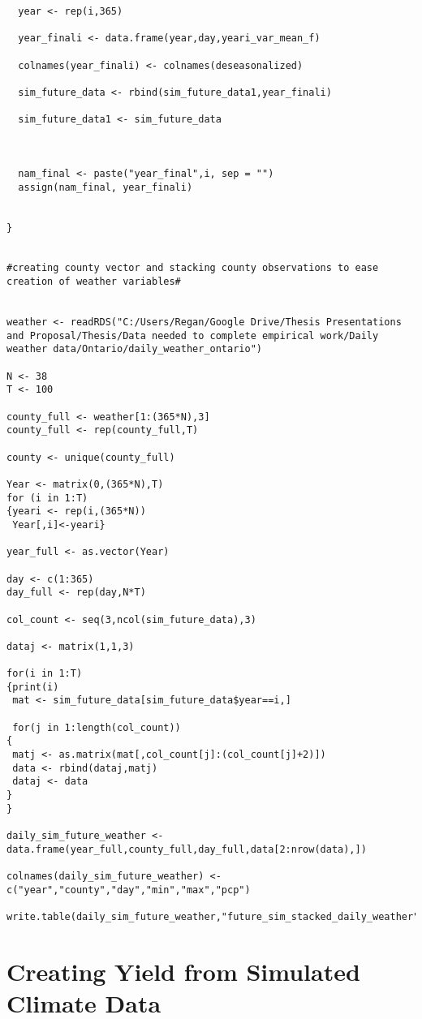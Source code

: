\begin{lstlisting}
  year <- rep(i,365)
 
  year_finali <- data.frame(year,day,yeari_var_mean_f)

  colnames(year_finali) <- colnames(deseasonalized)
  
  sim_future_data <- rbind(sim_future_data1,year_finali)

  sim_future_data1 <- sim_future_data



  nam_final <- paste("year_final",i, sep = "")
  assign(nam_final, year_finali)
  
 
}


#creating county vector and stacking county observations to ease creation of weather variables#


weather <- readRDS("C:/Users/Regan/Google Drive/Thesis Presentations and Proposal/Thesis/Data needed to complete empirical work/Daily weather data/Ontario/daily_weather_ontario")

N <- 38
T <- 100

county_full <- weather[1:(365*N),3]
county_full <- rep(county_full,T)

county <- unique(county_full)

Year <- matrix(0,(365*N),T)
for (i in 1:T)
{yeari <- rep(i,(365*N))
 Year[,i]<-yeari}

year_full <- as.vector(Year)

day <- c(1:365)
day_full <- rep(day,N*T)

col_count <- seq(3,ncol(sim_future_data),3)

dataj <- matrix(1,1,3)

for(i in 1:T)
{print(i)
 mat <- sim_future_data[sim_future_data$year==i,]

 for(j in 1:length(col_count))
{
 matj <- as.matrix(mat[,col_count[j]:(col_count[j]+2)])
 data <- rbind(dataj,matj)
 dataj <- data
}
}

daily_sim_future_weather <- data.frame(year_full,county_full,day_full,data[2:nrow(data),])

colnames(daily_sim_future_weather) <- c("year","county","day","min","max","pcp")

write.table(daily_sim_future_weather,"future_sim_stacked_daily_weather")
\end{lstlisting}

\section{Creating Yield from Simulated Climate Data}

